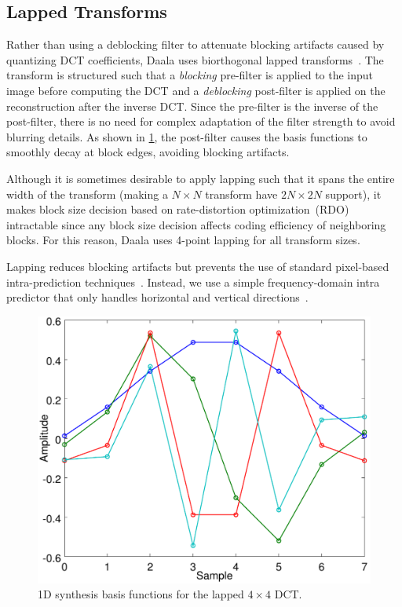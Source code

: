 \documentclass[english,conference,10pt]{IEEEtran}
\begin{document}
\subsection{Lapped Transforms}

Rather than using a deblocking filter to attenuate blocking artifacts caused
by quantizing DCT coefficients, Daala uses biorthogonal lapped
transforms~\cite{MalvarS89,Tran2003}. The transform is structured such that
a \textit{blocking} pre-filter is applied to the input image before computing
the DCT and a \textit{deblocking} post-filter is applied on the reconstruction
after the inverse DCT. Since the pre-filter is the inverse of the post-filter,
there is no need for complex adaptation of the filter strength to avoid blurring
details. As shown in \cref{fig:basis4}, the post-filter causes the basis functions
to smoothly decay at block edges, avoiding blocking artifacts.

Although it is sometimes desirable to apply lapping such that it spans the entire
width of the transform (making a $N \times N$ transform have $2N \times 2N$ support),
it makes block size decision based on rate-distortion optimization~(RDO) intractable
since any block size decision affects coding efficiency of neighboring blocks. For
this reason, Daala uses 4-point lapping for all transform sizes.

Lapping reduces blocking artifacts but prevents the use of standard pixel-based
intra-prediction techniques~\cite{DaedeDCC}. Instead, we use a simple
frequency-domain intra predictor that only handles horizontal and
vertical directions~\cite{EggePCS}. 

\begin{figure}
	\centering
	\includegraphics[width=0.8\columnwidth]{basis4}
	\caption{1D synthesis basis functions for the lapped $4 \times 4$ DCT.}
	\label{fig:basis4}
\end{figure}
\end{document}
